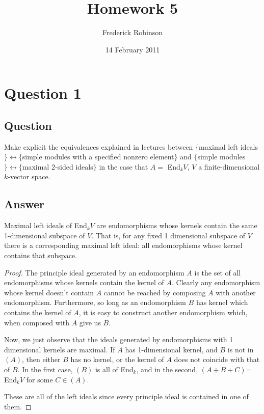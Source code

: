 \documentclass[11pt]{article}
\begin{document}



\title{Homework 5}
\author{Frederick Robinson}
\date{14 February 2011}
\maketitle




\section{Question 1}
\subsection{Question}
Make explicit the equivalences explained in lectures between $\{$maximal left ideals$\} \leftrightarrow \{$simple modules with a specified nonzero element$\}$ and $\{$simple modules$\} \leftrightarrow \{$maximal 2-sided ideals$\}$ in the case that $A = $ End$_kV$, $V$ a finite-dimensional $k$-vector space.
\subsection{Answer}
Maximal left ideals of End$_kV$ are endomorphisms whose kernels contain the same 1-dimensional subspace of $V$. That is, for any fixed 1 dimensional subspace of $V$ there is a corresponding maximal left ideal: all endomorphisms whose kernel contains that subspace.

\begin{proof}
The principle ideal generated by an endomorphism $A$ is the set of all endomorphisms whose kernels contain the kernel of $A$. Clearly any endomorphism whose kernel doesn't contain $A$ cannot be reached by composing $A$ with another endomorphism. Furthermore, so long as an endomorphism $B$ has kernel which contains the kernel of $A$, it is easy to construct another endomorphism which, when composed with $A$ give us $B$.

Now, we just observe that the ideals generated by endomorphisms with 1 dimensional kernels are maximal. If $A$ has 1-dimensional kernel, and $B$ is not in $(A)$, then either $B$ has no kernel, or the kernel of $A$ does not coincide with that of $B$. In the first case, $(B)$ is all of End$_k$, and in the second, $(A+B+C)$= End$_k V$ for some $C \in (A)$.

These are all of the left ideals since every principle ideal is contained in one of them.
\end{proof}
\end{document}
